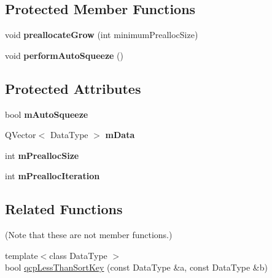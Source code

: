\subsection*{Protected Member Functions}
\begin{DoxyCompactItemize}
\item 
\mbox{\label{classQCPDataContainer_aae8cdb2bcc3b900ec22f26df3e7d67c7}} 
void {\bfseries preallocate\+Grow} (int minimum\+Prealloc\+Size)
\item 
\mbox{\label{classQCPDataContainer_a83c25ac14be1c920df85e797ee75c982}} 
void {\bfseries perform\+Auto\+Squeeze} ()
\end{DoxyCompactItemize}
\subsection*{Protected Attributes}
\begin{DoxyCompactItemize}
\item 
\mbox{\label{classQCPDataContainer_aae64c517d64511ad7a81ff8ee7b29147}} 
bool {\bfseries m\+Auto\+Squeeze}
\item 
\mbox{\label{classQCPDataContainer_a74906b4da829849c4062b5337c72585d}} 
Q\+Vector$<$ Data\+Type $>$ {\bfseries m\+Data}
\item 
\mbox{\label{classQCPDataContainer_a3554d3ad00e69f7ce057efa00ea6f4b2}} 
int {\bfseries m\+Prealloc\+Size}
\item 
\mbox{\label{classQCPDataContainer_ab2115bf023c29691f441eaf1889de84a}} 
int {\bfseries m\+Prealloc\+Iteration}
\end{DoxyCompactItemize}
\subsection*{Related Functions}
(Note that these are not member functions.) \begin{DoxyCompactItemize}
\item 
{\footnotesize template$<$class Data\+Type $>$ }\\bool \hyperlink{classQCPDataContainer_a74c5e06728cb6fa778a25d9ec0c4bd36}{qcp\+Less\+Than\+Sort\+Key} (const Data\+Type \&a, const Data\+Type \&b)
\end{DoxyCompactItemize}


